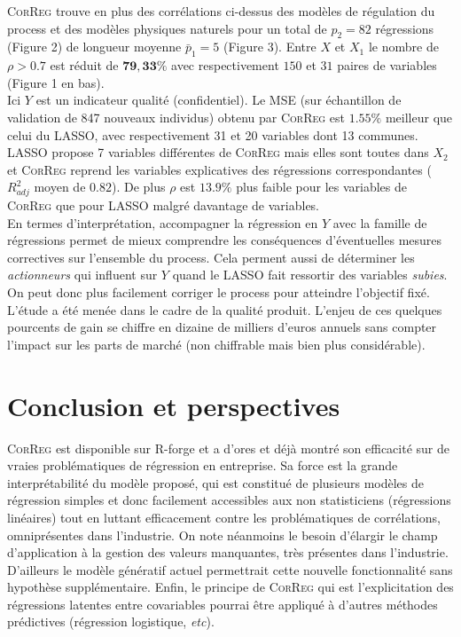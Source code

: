\documentclass[12pt]{article}
\begin{document}
\textsc{CorReg} trouve  en plus des corrélations ci-dessus des modèles de régulation du process et des modèles physiques naturels pour un total de $p_2=82$ régressions (Figure 2) de longueur moyenne $\bar p_1=5$ (Figure 3). 
Entre $X$ et $X_1$ le nombre de $\rho > 0.7$ est réduit de $\mathbf{79,33\%}$  avec respectivement $150$ et $31$ paires de variables (Figure 1 en bas).
\\
		Ici $Y$ est un indicateur qualité (confidentiel). Le MSE (sur échantillon de validation de 847 nouveaux individus) obtenu par \textsc{CorReg} est $\mathbf{1.55\%}$ meilleur que celui du LASSO, avec respectivement 31 et 20 variables dont 13 communes. LASSO propose 7 variables différentes de  \textsc{CorReg} mais elles sont toutes dans $X_2$ et \textsc{CorReg} reprend les variables explicatives des régressions correspondantes ($R^2_{adj}$ moyen de $0.82$). De plus $\rho$ est $13.9\%$ plus faible pour les variables de \textsc{CorReg} que pour LASSO malgré davantage de variables.
		\\
		En termes d'interprétation, accompagner la régression en $Y$ avec la famille de régressions permet de mieux comprendre les conséquences d'éventuelles mesures correctives sur l'ensemble du process. Cela perment aussi de déterminer les {\it actionneurs } qui influent sur $Y$ quand le LASSO fait ressortir des variables {\it subies}. On peut donc plus facilement corriger le process pour atteindre l'objectif fixé.
		 L'étude a été menée dans le cadre de la qualité produit. L'enjeu de ces quelques pourcents de gain se chiffre en dizaine de milliers d'euros annuels sans compter l'impact sur les parts de marché (non chiffrable mais bien plus considérable).
	


\section{Conclusion et perspectives}\label{secconcl}
	\textsc{CorReg} est disponible sur R-forge et a d'ores et déjà montré son efficacité sur de vraies problématiques de régression en entreprise.
	Sa force est la grande interprétabilité du modèle proposé, qui est constitué de plusieurs modèles de régression simples et donc facilement accessibles aux non statisticiens (régressions linéaires) tout en luttant efficacement contre les problématiques de corrélations, omniprésentes dans l'industrie.
	On note néanmoins le besoin d'élargir le champ d'application à la gestion des valeurs manquantes, très présentes dans l'industrie. D'ailleurs le modèle génératif actuel permettrait cette nouvelle fonctionnalité sans hypothèse supplémentaire. Enfin, le principe de \textsc{CorReg} qui est l'explicitation des régressions latentes entre covariables pourrai être appliqué à d'autres méthodes prédictives (régression logistique, {\it etc}). %
	
\end{document}
